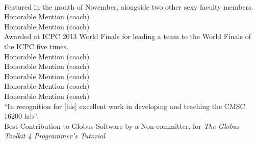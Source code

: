 \documentclass{resume}
\begin{document}
\begin{category}{}
\\Featured in the month of November, alongside two other sexy faculty members.
\\Honorable Mention (coach)
\\Honorable Mention (coach)
\\Awarded at ICPC 2013 World Finals for leading a team to the World Finals of the ICPC five times.
\\Honorable Mention (coach)
\\Honorable Mention (coach)
\\Honorable Mention (coach)
\\Honorable Mention (coach)
\\Honorable Mention (coach)
\\``In recognition for [his] excellent work in developing and teaching the CMSC 16200 lab''.
\\Best Contribution to Globus Software by a Non-committer, for \emph{The Globus Toolkit 4 Programmer's Tutorial}
\end{category}
\end{document}
